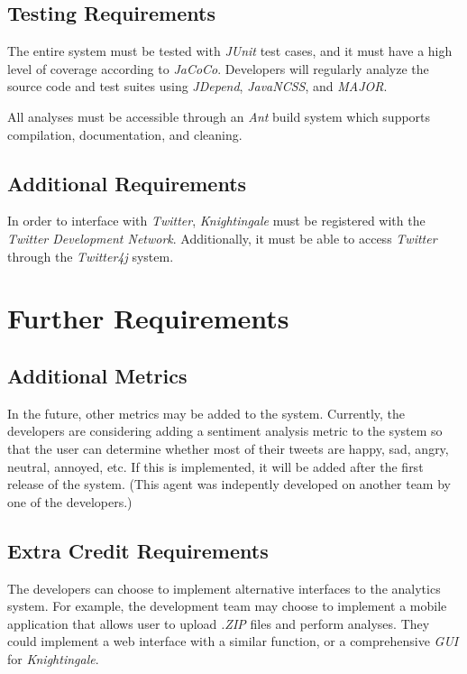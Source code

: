 \documentclass[a4paper, 12pt]{article}
\begin{document}
\subsection{Testing Requirements} \label{sec:testing}
\begin{adjustwidth}{2em}{0pt}
The entire system must be tested with \textit{JUnit} test cases, and it must have a high level of coverage according to \textit{JaCoCo}. Developers will regularly analyze the source code and test suites using \textit{JDepend}, \textit{JavaNCSS}, and \textit{MAJOR}. \newline 

\noindent All analyses must be accessible through an \textit{Ant} build system which supports compilation, documentation, and cleaning.
\end{adjustwidth}

\subsection{Additional Requirements} \label{sec:additional}
\begin{adjustwidth}{2em}{0pt}
In order to interface with \textit{Twitter}, \textit{Knightingale} must be registered with the \textit{Twitter Development Network}. Additionally, it must be able to access \textit{Twitter} through the \textit{Twitter4j} system.
\end{adjustwidth}

\section{Further Requirements} \label{sec:further}
\subsection{Additional Metrics} \label{sec:metrics}
\begin{adjustwidth}{2em}{0pt}
In the future, other metrics may be added to the system. Currently, the developers are considering adding a sentiment analysis metric to the system so that the user can determine whether most of their tweets are happy, sad, angry, neutral, annoyed, etc. If this is implemented, it will be added after the first release of the system. (This agent was indepently developed on another team by one of the developers.) 
\end{adjustwidth}

\subsection{Extra Credit Requirements} \label{sec:extracredit}
\begin{adjustwidth}{2em}{0pt}
The developers can choose to implement alternative interfaces to the analytics system. For example, the development team may choose to implement a mobile application that allows user to upload \textit{.ZIP} files and perform analyses. They could implement a web interface with a similar function, or a comprehensive \textit{GUI} for \textit{Knightingale}. 
\end{adjustwidth}
\end{document}
